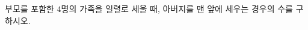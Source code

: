 \hspace*{2mm}\begin{minipage}[t]{\dimexpr\linewidth-2mm\relax}\vspace{0pt}
부모를 포함한 $4$명의 가족을 일렬로 세울 때, 아버지를 맨 앞에 세우는 경우의 수를 구하시오.\end{minipage}

